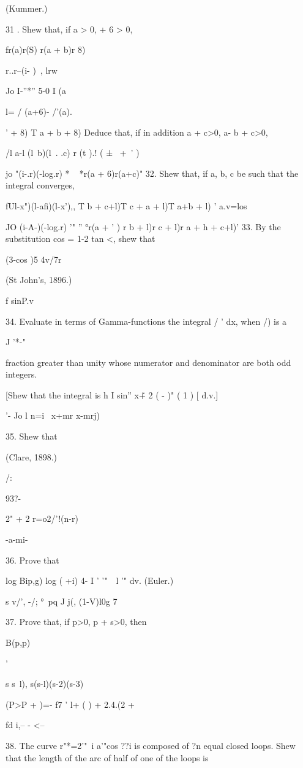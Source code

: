 (Kummer.)

31 . Shew that, if a > 0, + 6 > 0,

fr(a)r(S) r(a + b)r 8)

r..r--(i- ) \,, lrw

Jo I-''*'' 5-0 I (a

l= / (a+6)- /'(a).

' + 8) T a + b + 8) Deduce that, if in addition a + c>0, a- b + c>0,

/l a-l (l\ b)(l\ . .c) r (t ).! ( ± \ +\ ' )

jo "(i-.r)(-log.r) * ~ *r(a + 6)r(a+c)" 32. Shew that, if a, b, c be
such that the integral converges,

fUl-x")(l-afi)(l-x'),, T b + c+l)T c + a + l)T a+b + l) ' a.v=los

JO (i-A-)(-log.r) '" '' °r(a + ' ) r b + l)r c + l)r a + h + c+l)' 33.
By the substitution cos = 1-2 tan <, shew that

(3-cos )5 4v/7r

(St John's, 1896.)

f sinP.v

34. Evaluate in terms of Gamma-functions the integral / ' dx, when /)
is a

J '*-"

fraction greater than unity whose numerator and denominator are both
odd integers.

[Shew that the integral is h I sin'' x\~+ 2 ( - )" ( 1 ) [ d.v.]

'- Jo l n=i \ x+mr x-mrj)

35. Shew that

(Clare, 1898.)

/:

93?-

2" + 2 r=o2/'!(n-r)

-a-mi-

36. Prove that

log Bip,g) log ( +i) 4- I ' \: '"\ \ l '" dv. (Euler.)

s v/', -/; °\ pq J j(, (1-V)l0g 7

37. Prove that, if p>0, p + s>0, then

B(p,p)

 '

s s~l), s(s-l)(s-2)(s-3)

 (P>P + )=- f7 ' l+ ( ) + 2.4.(2 +

fd i,-- - <--

38. The curve r"*=2'"~i a'"cos ??i is composed of ?n equal closed
loops. Shew that the length of the arc of half of one of the loops is

